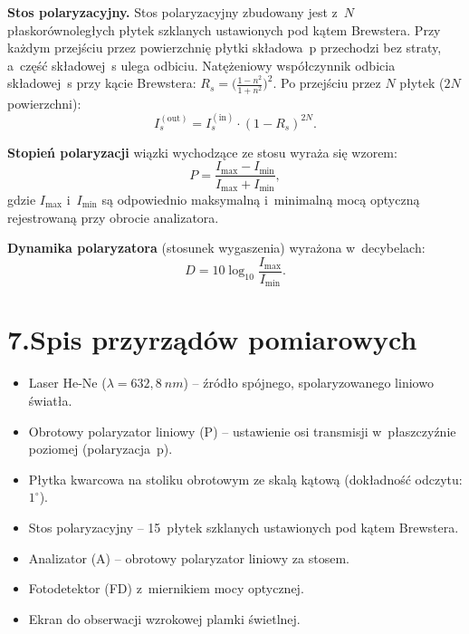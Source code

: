 \documentclass[a4paper,12pt]{article}
\begin{document}
\medskip
\textbf{Stos polaryzacyjny.}
Stos polaryzacyjny zbudowany jest z~$N$ płaskorównoległych płytek szklanych
ustawionych pod kątem Brewstera. Przy każdym przejściu przez powierzchnię
płytki składowa~p przechodzi bez straty, a~część składowej~s ulega odbiciu.
Natężeniowy współczynnik odbicia składowej~s przy kącie Brewstera:
$R_s = \bigl(\frac{1-n^2}{1+n^2}\bigr)^2$.
Po przejściu przez $N$ płytek ($2N$ powierzchni):
\begin{equation}
  I_s^{(\text{out})} = I_s^{(\text{in})}\cdot(1 - R_s)^{2N} .
  \label{eq:stos}
\end{equation}

\textbf{Stopień polaryzacji} wiązki wychodzące ze stosu wyraża się wzorem:
\begin{equation}
  P = \frac{I_{\max} - I_{\min}}{I_{\max} + I_{\min}} ,
  \label{eq:P}
\end{equation}
gdzie $I_{\max}$ i~$I_{\min}$ są odpowiednio maksymalną i~minimalną mocą
optyczną rejestrowaną przy obrocie analizatora.

\textbf{Dynamika polaryzatora} (stosunek wygaszenia) wyrażona w~decybelach:
\begin{equation}
  D = 10\log_{10}\frac{I_{\max}}{I_{\min}} .
  \label{eq:dB}
\end{equation}

\section*{7.\quad Spis przyrządów pomiarowych}

\begin{itemize}
  \item Laser He-Ne ($\lambda = 632{,}8\ \si{nm}$) -- źródło spójnego,
        spolaryzowanego liniowo światła.
  \item Obrotowy polaryzator liniowy (P) -- ustawienie osi transmisji
        w~płaszczyźnie poziomej (polaryzacja~p).
  \item Płytka kwarcowa na stoliku obrotowym ze skalą kątową
        (dokładność odczytu: \(1^\circ\)).
  \item Stos polaryzacyjny -- 15~płytek szklanych ustawionych pod kątem
        Brewstera.
  \item Analizator (A) -- obrotowy polaryzator liniowy za stosem.
  \item Fotodetektor (FD) z~miernikiem mocy optycznej.
  \item Ekran do obserwacji wzrokowej plamki świetlnej.
\end{itemize}
\end{document}
